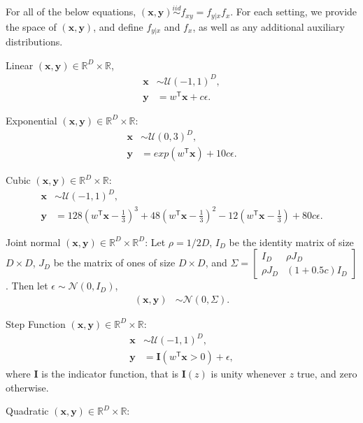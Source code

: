 \documentclass[11pt]{article}
\providecommand{\mb}[1]{\boldsymbol{#1}}
\providecommand{\mc}[1]{\mathcal{#1}}
\newcommand{\Real}{\mathbb{R}}
\newcommand{\T}{^{\ensuremath{\mathsf{T}}}}           %
\begin{document}
For all of the below equations, $(\mb{x},\mb{y}) \overset{iid}{\sim} f_{xy} = f_{y|x} f_x$. For each setting, we provide the space of $(\mb{x},\mb{y})$, and define $f_{y|x}$ and $f_x$, as well as any additional auxiliary distributions.

\setcounter{equation}{0}
\begin{compactenum}
\item Linear $(\mb{x},\mb{y}) \in \Real^{D} \times \Real$,
\begin{align*}
\mb{x} &\sim \mc{U}(-1,1)^{D},\\
\mb{y} &=w\T \mb{x}+c\epsilon.
\end{align*}
\item Exponential $(\mb{x},\mb{y}) \in \Real^{D} \times \Real$:
\begin{align*}
\mb{x} &\sim \mc{U}(0,3)^{D}, \\
\mb{y} &=exp(w\T \mb{x})+10c\epsilon.
\end{align*}
\item Cubic $(\mb{x},\mb{y}) \in \Real^{D} \times \Real$:
\begin{align*}
\mb{x} &\sim \mc{U}(-1,1)^{D}, \\
\mb{y} &=128(w\T \mb{x}-\tfrac{1}{3})^3+48(w\T \mb{x}-\tfrac{1}{3})^2-12(w\T \mb{x}-\tfrac{1}{3})+80c\epsilon.
\end{align*}
\item Joint normal $(\mb{x},\mb{y}) \in \Real^{D} \times \Real^{D}$: Let $\rho=1/2D$, $I_{D}$ be the identity matrix of size $D \times D$, $J_{D}$ be the matrix of ones of size $D \times D$, and $\Sigma = \begin{bmatrix} I_{D}&\rho J_{D}\\ \rho J_{D}& (1+0.5c) I_{D} \end{bmatrix}$. Then let $\epsilon \sim \mc{N}(0, I_{D})$,
\begin{align*}
(\mb{x}, \mb{y}) &\sim \mc{N}(0, \Sigma). 
\end{align*}
\item Step Function $(\mb{x},\mb{y}) \in \Real^{D} \times \Real$:
\begin{align*}
\mb{x} &\sim \mc{U}(-1,1)^{D},\\
\mb{y} &=\mb{I}(w\T \mb{x}>0)+\epsilon,
\end{align*}
where $\mb{I}$ is the indicator function, that is $\mb{I}(z)$ is unity whenever $z$ true, and zero otherwise.
\item Quadratic $(\mb{x},\mb{y}) \in \Real^{D} \times \Real$:
\begin{align*}

\end{align*}
\end{compactenum}
\end{document}
